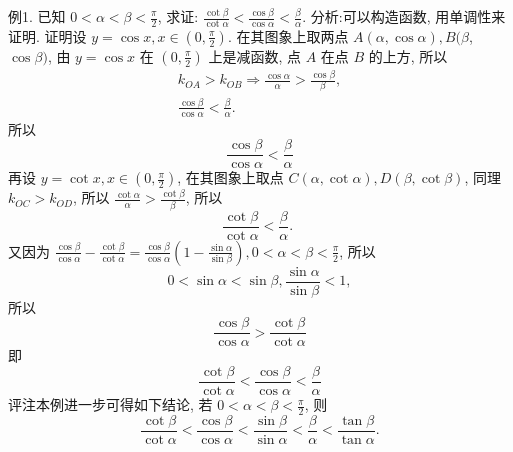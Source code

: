 例1. 已知 $0<\alpha<\beta<\frac{\pi}{2}$, 求证: $\frac{\cot \beta}{\cot \alpha}<\frac{\cos \beta}{\cos \alpha}<\frac{\beta}{\alpha}$.
分析:可以构造函数, 用单调性来证明.
证明设 $y=\cos x, x \in\left(0, \frac{\pi}{2}\right)$. 在其图象上取两点 $A(\alpha, \cos \alpha), B(\beta$, $\cos \beta)$, 由 $y=\cos x$ 在 $\left(0, \frac{\pi}{2}\right)$ 上是减函数, 点 $A$ 在点 $B$ 的上方, 所以
$$
\begin{gathered}
k_{O A}>k_{O B} \Rightarrow \frac{\cos \alpha}{\alpha}>\frac{\cos \beta}{\beta}, \\
\frac{\cos \beta}{\cos \alpha}<\frac{\beta}{\alpha} .
\end{gathered}
$$
所以
$$
\frac{\cos \beta}{\cos \alpha}<\frac{\beta}{\alpha}
$$
再设 $y=\cot x, x \in\left(0, \frac{\pi}{2}\right)$, 在其图象上取点 $C(\alpha, \cot \alpha), D(\beta, \cot \beta)$, 同理 $k_{O C}>k_{O D}$, 所以 $\frac{\cot \alpha}{\alpha}>\frac{\cot \beta}{\beta}$, 所以
$$
\frac{\cot \beta}{\cot \alpha}<\frac{\beta}{\alpha} \text {. }
$$
又因为 $\frac{\cos \beta}{\cos \alpha}-\frac{\cot \beta}{\cot \alpha}=\frac{\cos \beta}{\cos \alpha}\left(1-\frac{\sin \alpha}{\sin \beta}\right), 0<\alpha<\beta<\frac{\pi}{2}$,
所以
$$
0<\sin \alpha<\sin \beta, \frac{\sin \alpha}{\sin \beta}<1,
$$
所以
$$
\frac{\cos \beta}{\cos \alpha}>\frac{\cot \beta}{\cot \alpha}
$$
即
$$
\frac{\cot \beta}{\cot \alpha}<\frac{\cos \beta}{\cos \alpha}<\frac{\beta}{\alpha}
$$
评注本例进一步可得如下结论, 若 $0<\alpha<\beta<\frac{\pi}{2}$, 则
$$
\frac{\cot \beta}{\cot \alpha}<\frac{\cos \beta}{\cos \alpha}<\frac{\sin \beta}{\sin \alpha}<\frac{\beta}{\alpha}<\frac{\tan \beta}{\tan \alpha} .
$$



